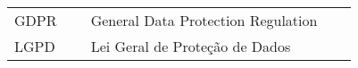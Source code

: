 

\begin{listaacron}

\begin{longtable}[l]{p{0.2\linewidth}p{0.7\linewidth}}
GDPR & General Data Protection Regulation\\
LGPD & Lei Geral de Proteção de Dados\\
\end{longtable}

\end{listaacron}

